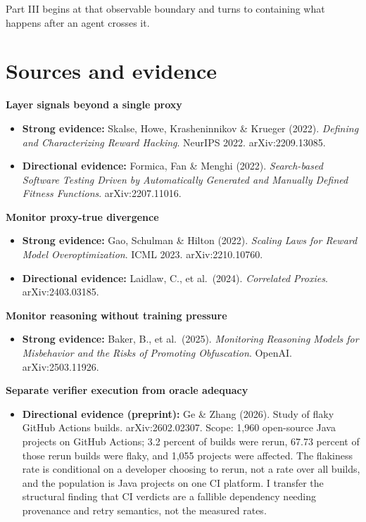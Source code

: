 Part III begins at that observable boundary and turns to containing what happens after an agent crosses it.

\section*{Sources and evidence}

\textbf{Layer signals beyond a single proxy}

\begin{itemize}
\tightlist
\item
  \textbf{Strong evidence:} Skalse, Howe, Krasheninnikov \& Krueger (2022). \emph{Defining and Characterizing Reward Hacking}. NeurIPS 2022. arXiv:2209.13085.
\item
  \textbf{Directional evidence:} Formica, Fan \& Menghi (2022). \emph{Search-based Software Testing Driven by Automatically Generated and Manually Defined Fitness Functions}. arXiv:2207.11016.
\end{itemize}

\textbf{Monitor proxy-true divergence}

\begin{itemize}
\tightlist
\item
  \textbf{Strong evidence:} Gao, Schulman \& Hilton (2022). \emph{Scaling Laws for Reward Model Overoptimization}. ICML 2023. arXiv:2210.10760.
\item
  \textbf{Directional evidence:} Laidlaw, C., et al.~(2024). \emph{Correlated Proxies}. arXiv:2403.03185.
\end{itemize}

\textbf{Monitor reasoning without training pressure}

\begin{itemize}
\tightlist
\item
  \textbf{Strong evidence:} Baker, B., et al.~(2025). \emph{Monitoring Reasoning Models for Misbehavior and the Risks of Promoting Obfuscation}. OpenAI. arXiv:2503.11926.
\end{itemize}

\textbf{Separate verifier execution from oracle adequacy}

\begin{itemize}
\tightlist
\item
  \textbf{Directional evidence (preprint):} Ge \& Zhang (2026). Study of flaky GitHub Actions builds. arXiv:2602.02307. Scope: 1,960 open-source Java projects on GitHub Actions; 3.2 percent of builds were rerun, 67.73 percent of those rerun builds were flaky, and 1,055 projects were affected. The flakiness rate is conditional on a developer choosing to rerun, not a rate over all builds, and the population is Java projects on one CI platform. I transfer the structural finding that CI verdicts are a fallible dependency needing provenance and retry semantics, not the measured rates.
\end{itemize}

